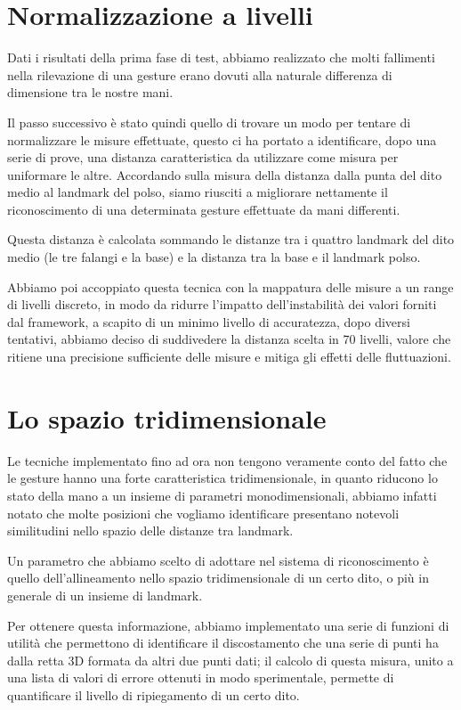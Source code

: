 \section{Normalizzazione a livelli}

Dati i risultati della prima fase di test, abbiamo realizzato che molti fallimenti nella rilevazione di una gesture erano dovuti alla naturale differenza di dimensione tra le nostre mani.

Il passo successivo è stato quindi quello di trovare un modo per tentare di normalizzare le misure effettuate, questo ci ha portato a identificare, dopo una serie di prove, una distanza caratteristica da utilizzare come misura per uniformare le altre. Accordando sulla misura della distanza dalla punta del dito medio al landmark del polso, siamo riusciti a migliorare nettamente il riconoscimento di una determinata gesture effettuate da mani differenti.

Questa distanza è calcolata sommando le distanze tra i quattro landmark del dito medio (le tre falangi e la base) e la distanza tra la base e il landmark polso.

Abbiamo poi accoppiato questa tecnica con la mappatura delle misure a un range di livelli discreto, in modo da ridurre l'impatto dell'instabilità dei valori forniti dal framework, a scapito di un minimo livello di accuratezza, dopo diversi tentativi, abbiamo deciso di suddivedere la distanza scelta in 70 livelli, valore che ritiene una precisione sufficiente delle misure e mitiga gli effetti delle fluttuazioni.

\section{Lo spazio tridimensionale}

Le tecniche implementato fino ad ora non tengono veramente conto del fatto che le gesture hanno una forte caratteristica tridimensionale, in quanto riducono lo stato della mano a un insieme di parametri monodimensionali, abbiamo infatti notato che molte posizioni che vogliamo identificare presentano notevoli similitudini nello spazio delle distanze tra landmark.

Un parametro che abbiamo scelto di adottare nel sistema di riconoscimento è quello dell'allineamento nello spazio tridimensionale di un certo dito, o più in generale di un insieme di landmark.

Per ottenere questa informazione, abbiamo implementato una serie di funzioni di utilità che permettono di identificare il discostamento che una serie di punti ha dalla retta 3D formata da altri due punti dati; il calcolo di questa misura, unito a una lista di valori di errore ottenuti in modo sperimentale, permette di quantificare il livello di ripiegamento di un certo dito.

